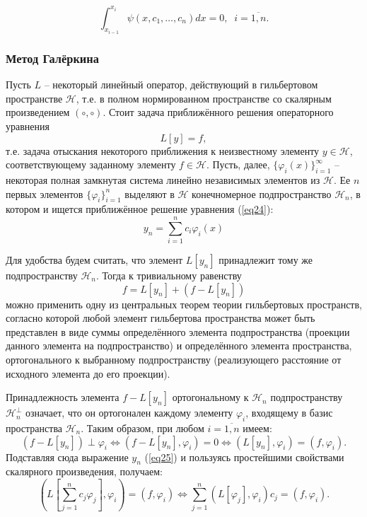 \documentclass[
11pt,
master, %
subf, %
href, %
colorlinks=true, %
times, %
]{disser}
\begin{document}
$$\int_{x_{i-1}}^{x_i} \psi(x, c_1, \ldots, c_n)dx = 0, \;\; i = \overline{1,n}.$$

\subsubsection{Метод Галёркина}
Пусть $L$ -- некоторый линейный оператор, действующий в гильбертовом пространстве $\mathcal{H}$, т.е. в полном нормированном пространстве со скалярным произведением $(\circ, \circ)$. Стоит задача приближённого решения операторного уравнения
\begin{equation}\label{eq24}
    L[y] = f,
\end{equation}
т.е. задача отыскания некоторого приближения к неизвестному элементу $y \in \mathcal{H}$, соответствующему заданному элементу $f \in \mathcal{H}$. Пусть, далее, $\{\varphi_i(x)\}_{i=1}^\infty$ -- некоторая полная замкнутая система линейно независимых элементов из $\mathcal{H}$. Ее $n$ первых элементов $\{\varphi_i\}_{i=1}^n$ выделяют в $\mathcal{H}$ конечномерное подпространство $\mathcal{H}_n$, в котором и ищется приближённое решение уравнения (\ref{eq24}):
\begin{equation}\label{eq25}
    y_n = \sum_{i=1}^{n}c_i \varphi_i(x)
\end{equation}

Для удобства будем считать, что элемент $L[y_n]$ принадлежит тому же подпространству $\mathcal{H}_n$. Тогда к тривиальному равенству
$$f = L[y_n] + (f - L[y_n])$$
можно применить одну из центральных теорем теории гильбертовых пространств, согласно которой любой элемент гильбертова пространства может быть представлен в виде суммы определённого элемента подпространства (проекции данного элемента на подпространство) и определённого элемента пространства, ортогонального к выбранному подпространству (реализующего расстояние от исходного элемента до его проекции).

Принадлежность элемента $f - L[y_n]$ ортогональному к $\mathcal{H}_n$ подпространству $\mathcal{H}_n^\perp$ означает, что он ортогонален каждому элементу $\varphi_i$, входящему в базис пространства $\mathcal{H}_n$. Таким образом, при любом $i = \overline{1,n}$ имеем:
$$(f - L[y_n]) \perp \varphi_i \Leftrightarrow (f - L[y_n], \varphi_i) = 0 \Leftrightarrow (L[y_n], \varphi_i) = (f, \varphi_i).$$
Подставляя сюда выражение $y_n$ (\ref{eq25}) и пользуясь простейшими свойствами скалярного произведения, получаем:
\begin{equation}\label{eq26}
    \left(L\left[\sum_{j=1}^{n} c_j \varphi_j\right], \varphi_i\right) = (f, \varphi_i) \Leftrightarrow \sum_{j=1}^{n}(L[\varphi_j], \varphi_i)c_j = (f, \varphi_i).
\end{equation}
\end{document}
